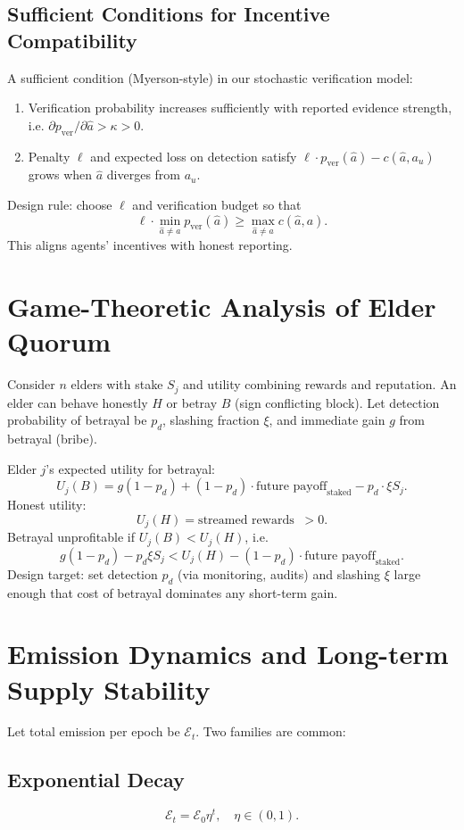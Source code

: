 \documentclass[11pt,a4paper]{article}
\begin{document}
\subsection{Sufficient Conditions for Incentive Compatibility}
A sufficient condition (Myerson-style) in our stochastic verification model:
\begin{enumerate}
  \item Verification probability increases sufficiently with reported evidence strength, i.e. \(\partial p_{\text{ver}}/\partial \hat a > \kappa>0\).
  \item Penalty \(\ell\) and expected loss on detection satisfy \(\ell\cdot p_{\text{ver}}(\hat a) - c(\hat a,a_u)\) grows when \(\hat a\) diverges from \(a_u\).
\end{enumerate}
Design rule: choose \(\ell\) and verification budget so that
\[
\ell \cdot \min_{\hat a\ne a} p_{\text{ver}}(\hat a) \ge \max_{\hat a\ne a} c(\hat a,a).
\]
This aligns agents' incentives with honest reporting.

\section{Game-Theoretic Analysis of Elder Quorum}

Consider \(n\) elders with stake \(S_j\) and utility combining rewards and reputation. An elder can behave honestly \(H\) or betray \(B\) (sign conflicting block). Let detection probability of betrayal be \(p_d\), slashing fraction \(\xi\), and immediate gain \(g\) from betrayal (bribe).

Elder \(j\)'s expected utility for betrayal:
\[
U_j(B) = g(1-p_d) + (1-p_d)\cdot \text{future payoff}_{\text{staked}} - p_d\cdot \xi S_j.
\]
Honest utility:
\[
U_j(H) = \text{streamed rewards} \;\; >0.
\]
Betrayal unprofitable if \(U_j(B)<U_j(H)\), i.e.
\[
g(1-p_d) - p_d\xi S_j < U_j(H) - (1-p_d)\cdot\text{future payoff}_{\text{staked}}.
\]
Design target: set detection \(p_d\) (via monitoring, audits) and slashing \(\xi\) large enough that cost of betrayal dominates any short-term gain.

\section{Emission Dynamics and Long-term Supply Stability}

Let total emission per epoch be \(\mathcal{E}_t\). Two families are common:

\subsection{Exponential Decay}
\[
\mathcal{E}_t = \mathcal{E}_0 \eta^t,\quad \eta\in(0,1).
\]
\end{document}
